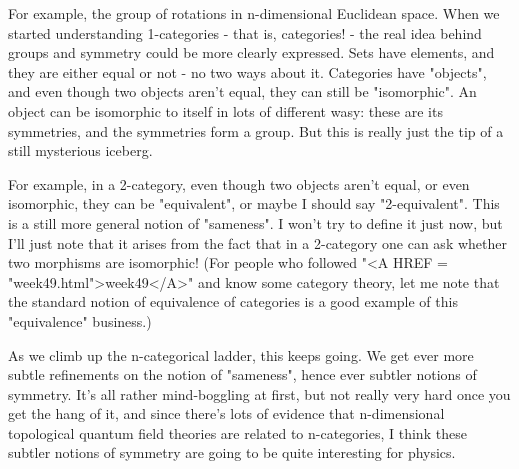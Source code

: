 For example, the group of rotations in n-dimensional Euclidean space.
When we started understanding 1-categories - that is, categories! -
the real idea behind groups and symmetry could be more clearly
expressed.  Sets have elements, and they are either equal or not - no
two ways about it.  Categories have "objects", and even though two
objects aren't equal, they can still be "isomorphic".  An object can
be isomorphic to itself in lots of different wasy: these are its
symmetries, and the symmetries form a group.  But this is really just
the tip of a still mysterious iceberg.  

For example, in a 2-category, even though two objects aren't equal, or
even isomorphic, they can be "equivalent", or maybe I should say
"2-equivalent".  This is a still more general notion of "sameness".  I
won't try to define it just now, but I'll just note that it arises
from the fact that in a 2-category one can ask whether two morphisms
are isomorphic!  (For people who followed "<A HREF =
"week49.html">week49</A>" and know some category theory, let me note
that the standard notion of equivalence of categories is a good
example of this "equivalence" business.)

As we climb up the n-categorical ladder, this keeps going.  We get
ever more subtle refinements on the notion of "sameness", hence ever
subtler notions of symmetry.  It's all rather mind-boggling at first,
but not really very hard once you get the hang of it, and since
there's lots of evidence that n-dimensional topological quantum field
theories are related to n-categories, I think these subtler notions of
symmetry are going to be quite interesting for physics.

